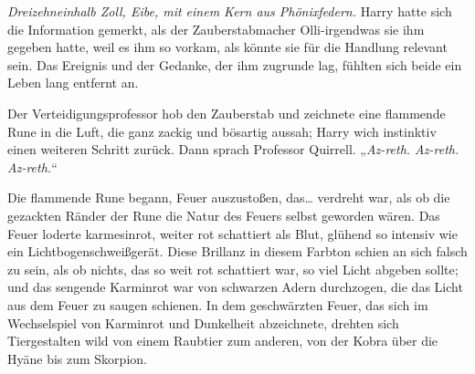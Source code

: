 \emph{Dreizehneinhalb Zoll, Eibe, mit einem Kern aus Phönixfedern.}
Harry hatte sich die Information gemerkt, als der Zauberstabmacher Olli-irgendwas sie ihm gegeben hatte, weil es ihm so vorkam, als könnte sie für die Handlung relevant sein. Das Ereignis und der Gedanke, der ihm zugrunde lag, fühlten sich beide ein Leben lang entfernt an.

Der Verteidigungsprofessor hob den Zauberstab und zeichnete eine flammende Rune in die Luft, die ganz zackig und bösartig aussah; Harry wich instinktiv einen weiteren Schritt zurück.
Dann sprach Professor Quirrell.
„\emph{Az-reth. Az-reth. Az-reth.}“

Die flammende Rune begann, Feuer auszustoßen, das… verdreht war, als ob die gezackten Ränder der Rune die Natur des Feuers selbst geworden wären. Das Feuer loderte karmesinrot, weiter rot schattiert als Blut, glühend so intensiv wie ein Lichtbogenschweißgerät. Diese Brillanz in diesem Farbton schien an sich falsch zu sein, als ob nichts, das so weit rot schattiert war, so viel Licht abgeben sollte; und das sengende Karminrot war von schwarzen Adern durchzogen, die das Licht aus dem Feuer zu saugen schienen. In dem geschwärzten Feuer, das sich im Wechselspiel von Karminrot und Dunkelheit abzeichnete, drehten sich Tiergestalten wild von einem Raubtier zum anderen, von der Kobra über die Hyäne bis zum Skorpion.

